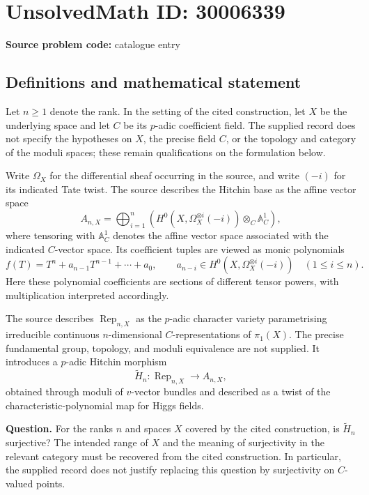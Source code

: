 \documentclass[11pt]{article}
\begin{document}
\section*{UnsolvedMath ID: 30006339}
\textbf{Source problem code:} catalogue entry
\subsection{Definitions and mathematical statement}
Let \(n\geq 1\) denote the rank. In the setting of the cited construction, let \(X\) be the underlying space and let \(C\) be its \(p\)-adic coefficient field. The supplied record does not specify the hypotheses on \(X\), the precise field \(C\), or the topology and category of the moduli spaces; these remain qualifications on the formulation below.

Write \(\Omega_X\) for the differential sheaf occurring in the source, and write \((-i)\) for its indicated Tate twist. The source describes the Hitchin base as the affine vector space
\[
 A_{n,X}=\bigoplus_{i=1}^{n}\left(H^0\!\left(X,\Omega_X^{\otimes i}(-i)\right)\otimes_C\mathbb A_C^1\right),
\]
where tensoring with \(\mathbb A_C^1\) denotes the affine vector space associated with the indicated \(C\)-vector space. Its coefficient tuples are viewed as monic polynomials
\[
 f(T)=T^n+a_{n-1}T^{n-1}+\cdots+a_0,
 \qquad
 a_{n-i}\in H^0\!\left(X,\Omega_X^{\otimes i}(-i)\right)
 \quad(1\leq i\leq n).
\]
Here these polynomial coefficients are sections of different tensor powers, with multiplication interpreted accordingly.

The source describes \(\operatorname{Rep}_{n,X}\) as the \(p\)-adic character variety parametrising irreducible continuous \(n\)-dimensional \(C\)-representations of \(\pi_1(X)\). The precise fundamental group, topology, and moduli equivalence are not supplied. It introduces a \(p\)-adic Hitchin morphism
\[
 \widetilde H_n:\operatorname{Rep}_{n,X}\longrightarrow A_{n,X},
\]
obtained through moduli of \(v\)-vector bundles and described as a twist of the characteristic-polynomial map for Higgs fields.

\textbf{Question.} For the ranks \(n\) and spaces \(X\) covered by the cited construction, is \(\widetilde H_n\) surjective? The intended range of \(X\) and the meaning of surjectivity in the relevant category must be recovered from the cited construction. In particular, the supplied record does not justify replacing this question by surjectivity on \(C\)-valued points.
\end{document}

